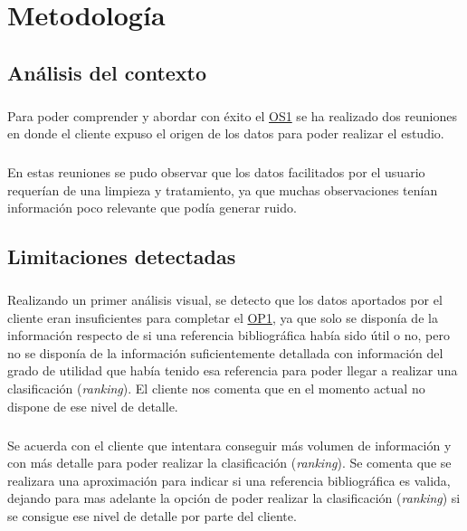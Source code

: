 \chapter{Metodología}
\label{chapter:metodologia}


\section{Análisis del contexto}

\paragraph{}
Para poder comprender y abordar con éxito el \hyperref[os:OS1]{OS1} se ha realizado dos reuniones en donde el cliente expuso el origen de los datos para poder realizar el estudio.

\paragraph{}
En estas reuniones se pudo observar que los datos facilitados por el usuario requerían de una limpieza y tratamiento, ya que muchas observaciones tenían información poco relevante que podía generar ruido.

\section{Limitaciones detectadas}

\paragraph{}
Realizando un primer análisis visual, se detecto que los datos aportados por el cliente eran insuficientes para completar el \hyperref[op:OP1]{OP1}, ya que solo se disponía de la información respecto de si una referencia bibliográfica había sido útil o no, pero no se disponía de la información suficientemente detallada con información del grado de utilidad que había tenido esa referencia para poder llegar a realizar una clasificación (\textit{ranking}). El cliente nos comenta que en el momento actual no dispone de ese nivel de detalle.

\paragraph{}
Se acuerda con el cliente que intentara conseguir más volumen de información y con más detalle para poder realizar la clasificación (\textit{ranking}). Se comenta que se realizara una aproximación para indicar si una referencia bibliográfica es valida, dejando para mas adelante la opción de poder realizar la clasificación (\textit{ranking}) si se consigue ese nivel de detalle por parte del cliente.

